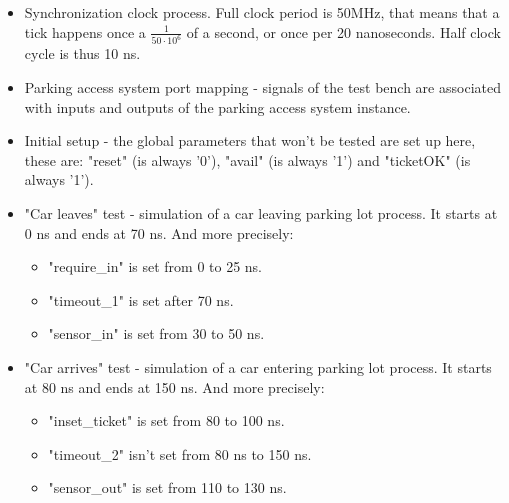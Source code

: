 \documentclass{article}
\begin{document}
	\begin{itemize}[nosep]
		\item Synchronization clock process. Full clock period is 50MHz, that means that a tick happens once a $\frac{1}{50 \cdot 10^6}$ of a second, or once per 20 nanoseconds. Half clock cycle is thus 10 ns.
		\item Parking access system port mapping - signals of the test bench are associated with inputs and outputs of the parking access system instance.
		\item Initial setup - the global parameters that won't be tested are set up here, these are: "reset" (is always '0'), "avail" (is always '1') and "ticketOK" (is always '1').
		\item "Car leaves" test - simulation of a car leaving parking lot process. It starts at 0 ns and ends at 70 ns. And more precisely:
		\begin{itemize}[nosep]
			\item "require\_in" is set from 0 to 25 ns.
			\item "timeout\_1" is set after 70 ns.
			\item "sensor\_in" is set from 30 to 50 ns.
		\end{itemize}
		\item "Car arrives" test - simulation of a car entering parking lot process. It starts at 80 ns and ends at 150 ns. And more precisely:
		\begin{itemize}[nosep]
			\item "inset\_ticket" is set from 80 to 100 ns.
			\item "timeout\_2" isn't set from 80 ns to 150 ns.
			\item "sensor\_out" is set from 110 to 130 ns.
		\end{itemize}
	\end{itemize}
	
	
	
\end{document}
